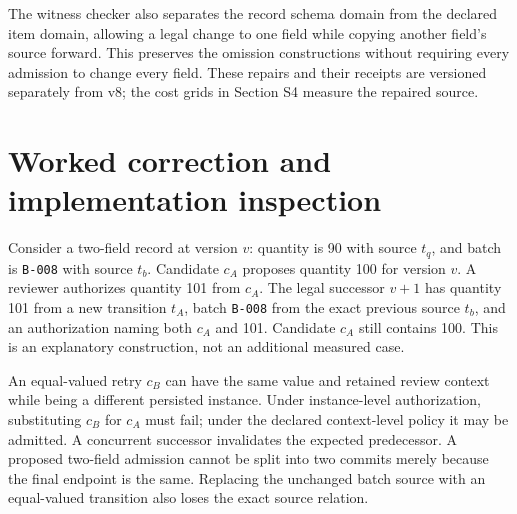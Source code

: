 \documentclass[11pt,a4paper]{article}
\newcommand{\code}[1]{\nolinkurl{#1}}
\begin{document}
The witness checker also separates the record schema domain from the declared item domain, allowing a legal change to one field while copying another field's source forward. This preserves the omission constructions without requiring every admission to change every field. These repairs and their receipts are versioned separately from v8; the cost grids in Section S4 measure the repaired source.

\section{Worked correction and implementation inspection}
\label{app:worked-example}

Consider a two-field record at version $v$: quantity is 90 with source $t_q$, and batch is \code{B-008} with source $t_b$. Candidate $c_A$ proposes quantity 100 for version $v$. A reviewer authorizes quantity 101 from $c_A$. The legal successor $v+1$ has quantity 101 from a new transition $t_A$, batch \code{B-008} from the exact previous source $t_b$, and an authorization naming both $c_A$ and 101. Candidate $c_A$ still contains 100. This is an explanatory construction, not an additional measured case.

An equal-valued retry $c_B$ can have the same value and retained review context while being a different persisted instance. Under instance-level authorization, substituting $c_B$ for $c_A$ must fail; under the declared context-level policy it may be admitted. A concurrent successor invalidates the expected predecessor. A proposed two-field admission cannot be split into two commits merely because the final endpoint is the same. Replacing the unchanged batch source with an equal-valued transition also loses the exact source relation.
\end{document}
